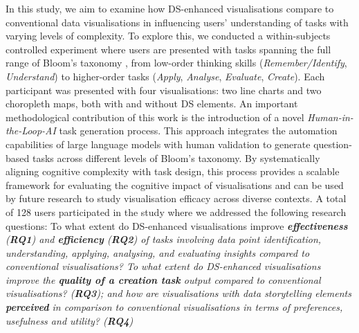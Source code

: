In this study, we aim to examine how DS-enhanced visualisations compare to conventional data visualisations in influencing users' understanding of tasks with varying levels of complexity. To explore this, we conducted a within-subjects controlled experiment where users are presented with tasks spanning the full range of Bloom's taxonomy \cite{krathwohl2002revision}, from low-order thinking skills (\textit{Remember/Identify}, \textit{Understand}) to higher-order tasks (\textit{Apply}, \textit{Analyse}, \textit{Evaluate}, \textit{Create}). Each participant was presented with four visualisations: two line charts and two choropleth maps, both with and without DS elements. An important methodological contribution of this work is the introduction of a novel \textit{Human-in-the-Loop-AI} task generation process. This approach integrates the automation capabilities of large language models with human validation to generate question-based tasks across different levels of Bloom's taxonomy. By systematically aligning cognitive complexity with task design, this process provides a scalable framework for evaluating the cognitive impact of visualisations and can be used by future research to study visualisation efficacy across diverse contexts.
A total of 128 users participated in the study where we addressed the following research questions: To what extent do DS-enhanced visualisations improve \textit{\textbf{effectiveness} (\textbf{RQ1}) and \textit{\textbf{efficiency}} (\textbf{RQ2}) of tasks involving data point identification, understanding, applying, analysing, and evaluating insights compared to conventional visualisations? To what extent do DS-enhanced visualisations improve the \textbf{\textit{quality of a creation task}} output compared to conventional visualisations? (\textbf{RQ3}); and how are visualisations with data storytelling elements \textbf{\textit{perceived}} in comparison to conventional visualisations in terms of preferences, usefulness and utility? (\textbf{RQ4})}

